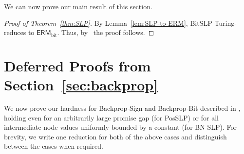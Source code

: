 \documentclass{article}
\theoremstyle{plain}
\theoremstyle{definition}
\theoremstyle{remark}
\begin{document}
We can now prove our main result of this section. 

\begin{proof} [Proof of Theorem~\ref{thm:SLP}]
 By Lemma~\ref{lem:SLP-to-ERM}, BitSLP Turing-reduces to $\mathsf{ERM}_{\text{bit}}$. 
Thus, by~ the proof follows.
\end{proof}



\section{Deferred Proofs from Section~\ref{sec:backprop}}

We now prove our hardness for Backprop-Sign and Backprop-Bit described in , holding even for an arbitrarily large promise gap (for PosSLP) or for all intermediate node values uniformly bounded by a constant (for BN-SLP). For brevity, we write one reduction for both of the above cases and distinguish between the cases when required. 
\end{document}
